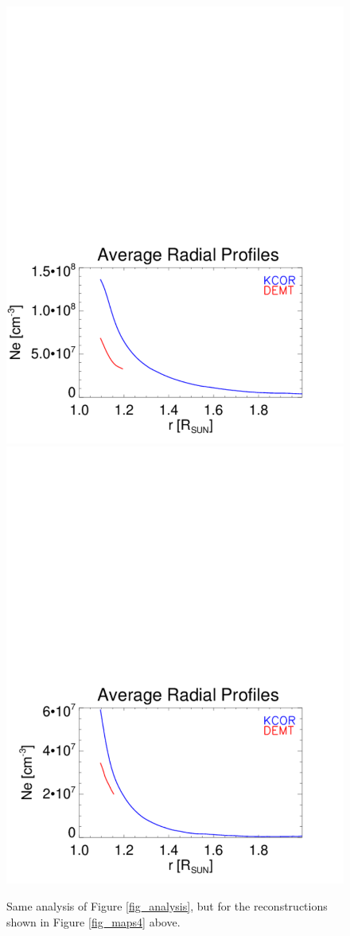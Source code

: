 \documentclass[baaa]{baaa}
\begin{document}
\begin{figure}[!h]
  \includegraphics[width=0.75\columnwidth]{Average_Radial_Profiles_KCOR-Tom_vs_DEMT_CR2198_Hh_l09_kcor_1e-5_bloqueados-Quiet-region1.pdf}
  \hskip 2cm
  \includegraphics[width=0.75\columnwidth]{Average_Radial_Profiles_KCOR-Tom_vs_DEMT_CR2198_Hh_l09_kcor_1e-5_bloqueados-Open-region_N.pdf}
  \caption{Same analysis of Figure \ref{fig_analysis}, but for the reconstructions shown in Figure \ref{fig_maps4} above.}
  \label{fig_analysis4}
\end{figure}
\end{document}
